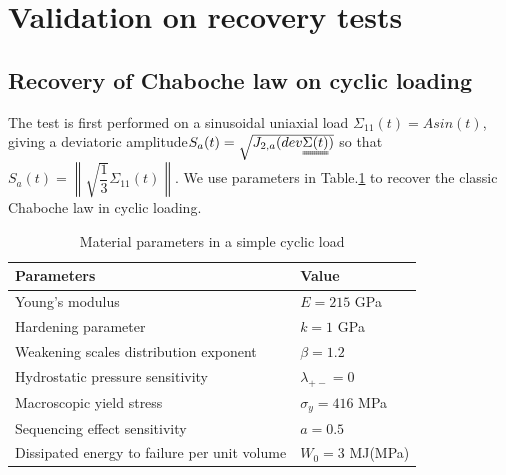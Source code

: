 \newpage
\section{Validation on recovery tests}
\label{sec:5.8}
\subsection{Recovery of Chaboche law on cyclic loading}
The test is first performed on a sinusoidal uniaxial load $\Sigma_{11}(t)=Asin(t)$, giving a deviatoric amplitude$S_{a}(t)=\sqrt{J_{2,a}(dev\uuline{\Sigma(t)})}$  so that $S_{a}(t)=\left\| \sqrt{\dfrac{1}{3}}\Sigma_{11}(t)\right\| $. We use parameters in Table.\ref{tab:Sin} to recover the classic Chaboche law in cyclic loading.
\begin{table}[!h]
\centering
\begin{tabular}{ll}
\hline
\textbf{Parameters}                                         & \textbf{Value}                    \\ \hline
Young's modulus                                             & $E=215$ GPa                       \\
Hardening parameter                                         &  $k=1$ GPa \\
Weakening scales distribution exponent                      & $\beta=1.2$                             \\
Hydrostatic pressure sensitivity                            & $\lambda_{+-}=0$                     \\
Macroscopic yield stress                                    & $\sigma_y=416$ MPa              \\
Sequencing effect sensitivity                               & $a=0.5$                        \\
Dissipated energy to failure per unit volume                & $W_0=3$ MJ(MPa)                       \\ \hline
\end{tabular}
\caption{Material parameters in a simple cyclic load }
\label{tab:Sin}
\end{table}

